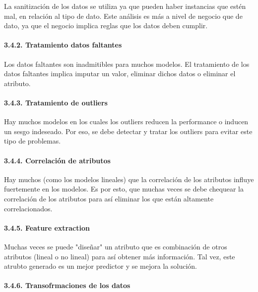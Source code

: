 \documentclass[11pt]{article}
\begin{document}
La sanitización de los datos se utiliza ya que pueden haber instancias
que estén mal, en relación al tipo de dato. Este análisis es más a nivel
de negocio que de dato, ya que el negocio implica reglas que los datos
deben cumplir.

    \paragraph{3.4.2. Tratamiento datos faltantes
}\label{tratamiento-datos-faltantes}

Los datos faltantes son inadmitibles para muchos modelos. El tratamiento
de los datos faltantes implica imputar un valor, eliminar dichos datos o
eliminar el atributo.

    \paragraph{3.4.3. Tratamiento de outliers
}\label{tratamiento-de-outliers}

Hay muchos modelos en los cuales los outliers reducen la performance o
inducen un sesgo indeseado. Por eso, se debe detectar y tratar los
outliers para evitar este tipo de problemas.

    \paragraph{3.4.4. Correlación de atributos
}\label{correlaciuxf3n-de-atributos}

Hay muchos (como los modelos lineales) que la correlación de los
atributos influye fuertemente en los modelos. Es por esto, que muchas
veces se debe chequear la correlación de los atributos para así eliminar
los que están altamente correlacionados.

    \paragraph{3.4.5. Feature extraction }\label{feature-extraction}

Muchas veces se puede "diseñar" un atributo que es combinación de otros
atributos (lineal o no lineal) para así obtener más información. Tal
vez, este atrubto generado es un mejor predictor y se mejora la
solución.

    \paragraph{3.4.6. Transofrmaciones de los datos
}\label{transofrmaciones-de-los-datos}
\end{document}
